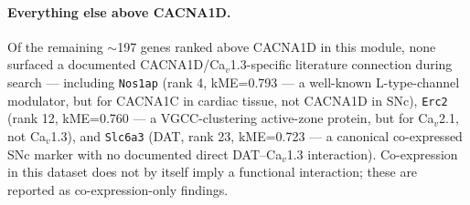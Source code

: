 \documentclass[11pt]{article}
\begin{document}
\paragraph{Everything else above CACNA1D.} Of the remaining $\sim$197 genes
ranked above CACNA1D in this module, none surfaced a documented
CACNA1D/Ca$_v$1.3-specific literature connection during search --- including
\texttt{Nos1ap} (rank 4, kME=0.793 --- a well-known L-type-channel modulator,
but for CACNA1C in cardiac tissue, not CACNA1D in SNc), \texttt{Erc2} (rank
12, kME=0.760 --- a VGCC-clustering active-zone protein, but for Ca$_v$2.1,
not Ca$_v$1.3), and \texttt{Slc6a3} (DAT, rank 23, kME=0.723 --- a canonical
co-expressed SNc marker with no documented direct DAT--Ca$_v$1.3 interaction).
Co-expression in this dataset does not by itself imply a functional
interaction; these are reported as co-expression-only findings.
\end{document}
